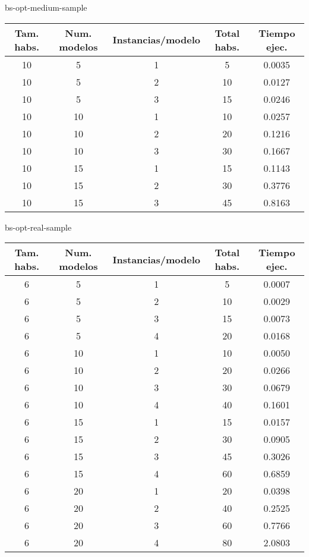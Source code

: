 bs-opt-medium-sample
\begin{center}
	\begin{tabular}{ | c | c | c | c | c | }
\hline
Tam. habs. & Num. modelos & Instancias/modelo & Total habs. & Tiempo ejec. \\ \hline 
10 & 5 & 1 & 5 & 0.0035 \\ 
10 & 5 & 2 & 10 & 0.0127 \\ 
10 & 5 & 3 & 15 & 0.0246 \\ 
10 & 10 & 1 & 10 & 0.0257 \\ 
10 & 10 & 2 & 20 & 0.1216 \\ 
10 & 10 & 3 & 30 & 0.1667 \\ 
10 & 15 & 1 & 15 & 0.1143 \\ 
10 & 15 & 2 & 30 & 0.3776 \\ 
10 & 15 & 3 & 45 & 0.8163 \\ 
\hline
	\end{tabular}
\end{center}

bs-opt-real-sample
\begin{center}
	\begin{tabular}{ | c | c | c | c | c | }
\hline
Tam. habs. & Num. modelos & Instancias/modelo & Total habs. & Tiempo ejec. \\ \hline 
6 & 5 & 1 & 5 & 0.0007 \\ 
6 & 5 & 2 & 10 & 0.0029 \\ 
6 & 5 & 3 & 15 & 0.0073 \\ 
6 & 5 & 4 & 20 & 0.0168 \\ 
6 & 10 & 1 & 10 & 0.0050 \\ 
6 & 10 & 2 & 20 & 0.0266 \\ 
6 & 10 & 3 & 30 & 0.0679 \\ 
6 & 10 & 4 & 40 & 0.1601 \\ 
6 & 15 & 1 & 15 & 0.0157 \\ 
6 & 15 & 2 & 30 & 0.0905 \\ 
6 & 15 & 3 & 45 & 0.3026 \\ 
6 & 15 & 4 & 60 & 0.6859 \\ 
6 & 20 & 1 & 20 & 0.0398 \\ 
6 & 20 & 2 & 40 & 0.2525 \\ 
6 & 20 & 3 & 60 & 0.7766 \\ 
6 & 20 & 4 & 80 & 2.0803 \\ 
\hline
	\end{tabular}
\end{center}

